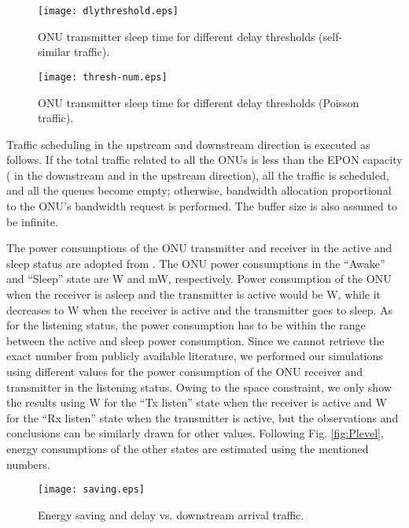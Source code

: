 \documentclass[11pt,english,12pt,onecolumn, draftcls]{IEEEtran}
\theoremstyle{plain}
\theoremstyle{definition}
\begin{document}
\begin{figure}
\centering
\texttt{[image: dlythreshold.eps]}
\caption{ONU transmitter sleep time for different delay thresholds (self-similar traffic).}
\label{fig:thresh}
\vspace{-.15in}
\end{figure}

\begin{figure}
\centering
\texttt{[image: thresh-num.eps]}
\caption{ONU transmitter sleep time for different delay thresholds (Poisson traffic).}
\label{fig:threshn}
\vspace{-.15in}
\end{figure}


Traffic scheduling in the upstream and downstream direction is executed as follows. If the total traffic related to all the ONUs is less than the EPON capacity ( in the downstream and  in the upstream direction), all the traffic is scheduled, and all the queues become empty; otherwise, bandwidth allocation proportional to the ONU's bandwidth request is performed. The buffer size is also assumed to be infinite.


The power consumptions of the ONU transmitter and receiver in the active and sleep status are adopted from \cite{series2000transmission}. The ONU power consumptions in the ``Awake'' and ``Sleep'' state are  W and  mW, respectively. Power consumption of the ONU when the receiver is asleep and the transmitter is active would be  W, while it decreases to  W when the receiver is active and the transmitter goes to sleep. As for the listening status, the power consumption has to be within the range between the active and sleep power consumption. Since we cannot retrieve the exact number from publicly available literature, we performed our simulations using different values for the power consumption of the ONU receiver and transmitter in the listening status. Owing to the space constraint, we only show the results using  W for the ``Tx listen'' state when the receiver is active and  W for the ``Rx listen'' state when the transmitter is active, but the observations and conclusions can be similarly drawn for other values. Following Fig. \ref{fig:Plevel}, energy consumptions of the other states are estimated using the mentioned numbers.

\begin{figure}
\centering
\texttt{[image: saving.eps]}
\caption{Energy saving and delay vs. downstream arrival traffic.}
\label{fig:save}
\vspace{-.2in}
\end{figure}
\end{document}
